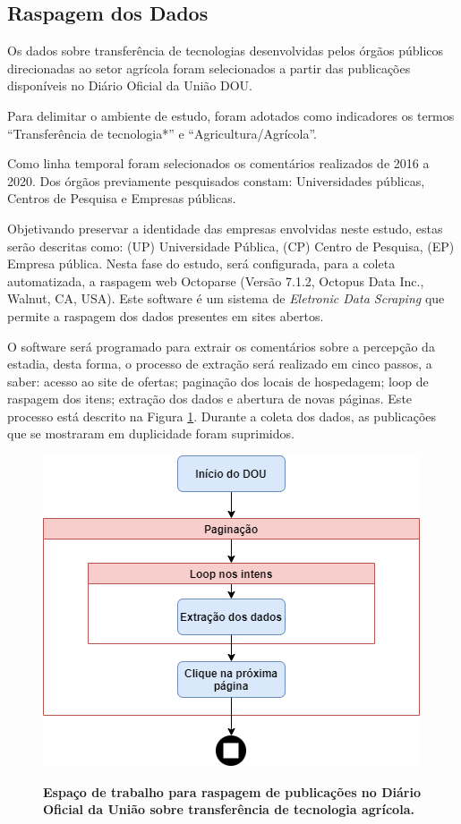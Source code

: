 \subsection{Raspagem dos Dados}

Os dados sobre transferência de tecnologias desenvolvidas pelos órgãos públicos direcionadas ao setor agrícola foram selecionados a partir das publicações disponíveis no Diário Oficial da União DOU.

Para delimitar o ambiente de estudo, foram adotados como indicadores os termos “Transferência de tecnologia*” e “Agricultura/Agrícola”. 

Como linha temporal foram selecionados os comentários realizados de 2016 a 2020. Dos órgãos previamente pesquisados  constam: Universidades públicas, Centros de Pesquisa e Empresas públicas.

Objetivando preservar a identidade das empresas envolvidas neste estudo, estas serão descritas como: (UP) Universidade Pública, (CP) Centro de Pesquisa, (EP) Empresa pública. Nesta fase do  estudo, será configurada, para a coleta automatizada, a raspagem web Octoparse (Versão 7.1.2, Octopus Data Inc., Walnut, CA, USA). Este software é um sistema de \textit{Eletronic Data Scraping} que permite a raspagem dos dados presentes em sites abertos. 

O software será programado para extrair os comentários sobre a percepção da estadia, desta forma, o processo de extração será realizado em cinco passos, a saber: acesso ao site de ofertas; paginação dos locais de hospedagem; loop de raspagem dos itens; extração dos dados e abertura de novas páginas. Este processo está descrito na Figura \ref{figura_raspagem}. Durante a coleta dos dados, as publicações que se mostraram em duplicidade foram suprimidos. 



\begin{figure}[H]
\centering
\caption{\textbf{Espaço de trabalho para raspagem de publicações no Diário Oficial da União sobre transferência de tecnologia agrícola.
}}
\includegraphics[scale=0.6]{Imagens/raspagem.png}
\label{figura_raspagem}
\end{figure}


